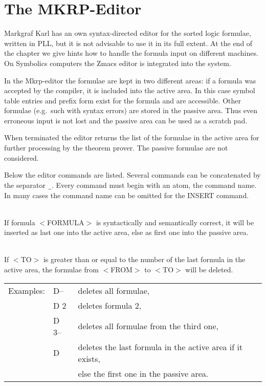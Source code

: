 \chapter{The MKRP-Editor}
\label{TheMKRPEditor}


{\sc Markgraf Karl} has an own syntax-directed editor for the 
sorted logic formulae, written in PLL, but it is not advisable to use it 
in its full extent. At the end of the chapter we give hints  how to handle
 the formula input on different machines. On Symbolics computers the Zmacs 
editor is integrated into the system. 

In the {\sc Mkrp}-editor the formulae are kept in two 
different areas: if a formula was accepted by the compiler, it is included 
into the active area. In this case symbol table entries and prefix form 
exist for the formula and are accessible.
Other formulae (e.g.\ such with syntax errors) are stored in the passive 
area. Thus even erroneous input is not lost and the passive area can be 
used as a scratch pad. 

When terminated the editor returns the list of the formulae in the active 
area for further processing by the theorem prover. The passive 
formulae are not considered. 

Below the editor commands are listed. Several commands can be
concatenated by the separator {\tt \_}. Every command must begin with
an atom, the command name. In many cases the command name can be
omitted for the INSERT command.

\newcommand\edc[2]{\pagebreak[3]{\bf #1}\\[1mm] #2}

\edc{I[NSERT] $<$FORMULA$>$ \\
$<$FORMULA$>$}%
{If formula $<$FORMULA$>$ is syntactically and semantically correct, it
 will be 
inserted as last one into the active area, else as first one into the
 passive area.}

\edc{D[ELETE] [$<$FROM$>$] [--] [$<$TO$>$]\\
D[ELETE] [$<$FROM$>$] [/] [$<$TO$>$]}%
{If $<$TO$>$ is greater than or equal to the number of the last formula in 
the active area, the 
formulae from $<$FROM$>$ to $<$TO$>$ will be deleted. 

\begin{tabular}{lll}
Examples:&	D--     &	deletes all formulae, \\
&	D 2&	deletes formula 2,\\
&	D 3--&	deletes all formulae from the third one, \\
&	D&	deletes the last formula in the active area if it exists, \\
&& else the first one in the passive area. 
\end{tabular}}

